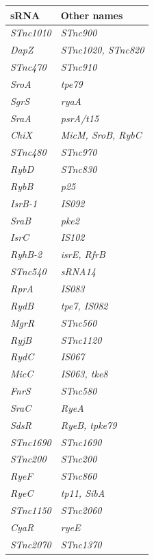 \begin{footnotesize}
\begin{longtable}{ll}
    \toprule
sRNA & Other names \\\midrule
    \endfirsthead
\textit{STnc1010} & \textit{STnc900} \\
\textit{DapZ} & \textit{STnc1020, STnc820} \\
\textit{STnc470}& \textit{STnc910} \\
\textit{SroA}& \textit{tpe79} \\
\textit{SgrS}& \textit{ryaA} \\
\textit{SraA}& \textit{psrA/t15} \\
\textit{ChiX}& \textit{MicM, SroB, RybC} \\
\textit{STnc480} & \textit{STnc970} \\
\textit{RybD} & \textit{STnc830} \\
\textit{RybB}& \textit{p25} \\
\textit{IsrB-1}& \textit{IS092} \\
\textit{SraB}& \textit{pke2} \\
\textit{IsrC}& \textit{IS102} \\
\textit{RyhB-2}& \textit{isrE, RfrB} \\
\textit{STnc540}& \textit{sRNA14} \\
\textit{RprA}& \textit{IS083} \\
\textit{RydB}& \textit{tpe7, IS082} \\
\textit{MgrR}& \textit{STnc560} \\
\textit{RyjB}& \textit{STnc1120} \\
\textit{RydC}& \textit{IS067} \\
\textit{MicC}& \textit{IS063, tke8} \\
\textit{FnrS}& \textit{STnc580} \\
\textit{SraC}& \textit{RyeA} \\
\textit{SdsR}& \textit{RyeB, tpke79} \\
\textit{STnc1690}& \textit{STnc1690} \\
\textit{STnc200}& \textit{STnc200} \\
\textit{RyeF}& \textit{STnc860} \\
\textit{RyeC}& \textit{tp11, SibA} \\
\textit{STnc1150}& \textit{STnc2060} \\
\textit{CyaR}& \textit{ryeE} \\
\textit{STnc2070}& \textit{STnc1370} \\

\end{longtable}
\end{footnotesize}
